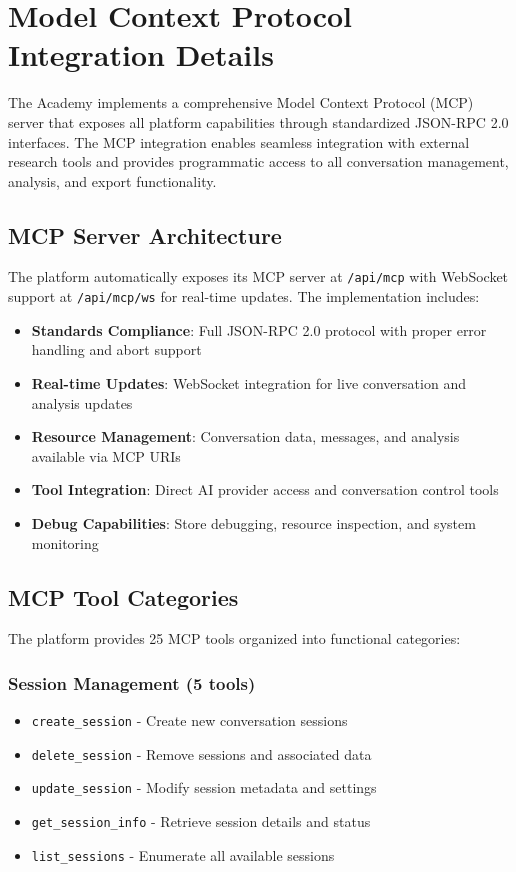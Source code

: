 \documentclass[11pt,letterpaper]{article}
\newcommand{\theacademy}{The Academy}
\begin{document}



\appendix

\section{Model Context Protocol Integration Details}
\label{app:mcp}

\theacademy{} implements a comprehensive Model Context Protocol (MCP) server that exposes all platform capabilities through standardized JSON-RPC 2.0 interfaces. The MCP integration enables seamless integration with external research tools and provides programmatic access to all conversation management, analysis, and export functionality.

\subsection{MCP Server Architecture}

The platform automatically exposes its MCP server at \texttt{/api/mcp} with WebSocket support at \texttt{/api/mcp/ws} for real-time updates. The implementation includes:

\begin{itemize}
    \item \textbf{Standards Compliance}: Full JSON-RPC 2.0 protocol with proper error handling and abort support
    \item \textbf{Real-time Updates}: WebSocket integration for live conversation and analysis updates
    \item \textbf{Resource Management}: Conversation data, messages, and analysis available via MCP URIs
    \item \textbf{Tool Integration}: Direct AI provider access and conversation control tools
    \item \textbf{Debug Capabilities}: Store debugging, resource inspection, and system monitoring
\end{itemize}

\subsection{MCP Tool Categories}

The platform provides 25 MCP tools organized into functional categories:

\subsubsection{Session Management (5 tools)}
\begin{itemize}
    \item \texttt{create\_session} - Create new conversation sessions
    \item \texttt{delete\_session} - Remove sessions and associated data
    \item \texttt{update\_session} - Modify session metadata and settings
    \item \texttt{get\_session\_info} - Retrieve session details and status
    \item \texttt{list\_sessions} - Enumerate all available sessions
\end{itemize}
\end{document}
